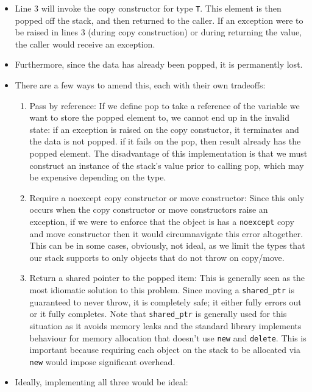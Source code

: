 \documentclass[11pt, a4paper]{article}
\theoremstyle{definition}
\theoremstyle{remark}
\newcommand{\code}[1]{\lstinline|#1|}
\begin{document}
\begin{itemize}
\begin{cppcode}
T foo(stack& data) {
    std::lock_guard<std::mutex> lock(m);
    T result = data.top();
    data.pop();
    return result;
}
\end{cppcode}
    \item Line 3 will invoke the copy constructor for type \code{T}. This element is then popped off the stack, and then returned to the caller. If an exception were to be raised in lines 3 (during copy construction) or during returning the value, the caller would receive an exception.
    \item Furthermore, since the data has already been popped, it is permanently lost.
    \item There are a few ways to amend this, each with their own tradeoffs: 
    \begin{enumerate}
        \item Pass by reference: If we define pop to take a reference of the variable we want to store the popped element to, we cannot end up in the invalid state: if an exception is raised on the copy constuctor, it terminates and the data is not popped. if it fails on the pop, then result already has the popped element. The disadvantage of this implementation is that we must construct an instance of the stack's value prior to calling pop, which may be expensive depending on the type.
        \item Require a noexcept copy constructor or move constructor: Since this only occurs when the copy constructor or move constructors raise an exception, if we were to enforce that the object is has a \code{noexcept} copy and move constructor then it would circumnavigate this error altogether. This can be in some cases, obviously, not ideal, as we limit the types that our stack supports to only objects that do not throw on copy/move.
        \item Return a shared pointer to the popped item: This is generally seen as the most idiomatic solution to this problem. Since moving a \code{shared_ptr} is guaranteed to never throw, it is completely safe; it either fully errors out or it fully completes. Note that \code{shared_ptr} is generally used for this situation as it avoids memory leaks and the standard library implements behaviour for memory allocation that doesn't use \code{new} and \code{delete}. This is important because requiring each object on the stack to be allocated via \code{new} would impose significant overhead.
    \end{enumerate}
    \item Ideally, implementing all three would be ideal: 

\end{itemize}
\end{document}
